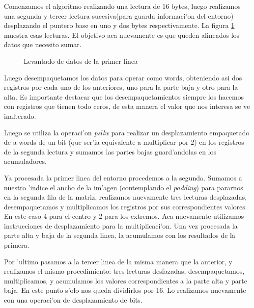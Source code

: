 Comenzamos el algoritmo realizando una lectura de 16 bytes, luego realizamos una segunda y tercer lectura sucesiva(para guarda informaci'on del entorno)
desplazando el puntero base en uno y dos bytes respectivamente. La figura \ref{est:s-dos} muestra esas lecturas. El objetivo aca nuevamente es que queden alineados los datos que necesito sumar.


\begin{figure}[h!]
\caption{Levantado de datos de la primer linea}
\label{est:s-dos}
\end{figure}

Luego desempaquetamos los datos para operar como words, obteniendo asi dos registros por cada uno de los anteriores, uno para la parte baja y otro para la alta. Es importante destacar que los desempaquetamientos siempre los hacemos con registros que tienen todo ceros, de esta manera el valor que nos interesa se ve inalterado. 

Luego se utiliza la operaci'on \textit{psllw} para realizar un desplazamiento empaquetado de a words de un bit (que ser'ia equivalente a multiplicar por 2) en los registros de la segunda lectura y sumamos las partes bajas guard'andolas en los acumuladores.

Ya procesada la primer linea del entorno procedemos a la segunda. Sumamos a nuestro 'indice el ancho de la 
im'agen (contemplando el \textit{padding}) para pararnos en la segunda fila de la matriz, realizamos nuevamente tres lecturas desplazadas, desempaquetamos y multiplicamos los registros por sus correspondientes valores. En este caso 4 para el centro y 2 para los extremos. Aca nuevamente utilizamos instrucciones de desplazamiento para la multiplicaci'on. Una vez procesada la parte alta y baja de la segunda linea, la acumulamos con los resultados de la primera.

Por 'ultimo pasamos a la tercer linea de la misma manera que la anterior, y realizamos el mismo procedimiento: tres lecturas desfazadas, desempaquetamos,  multiplicamos, y acumulamos los valores correspondientes a la parte alta y parte baja. En este punto s'olo nos queda dividirlos por 16. Lo realizamos nuevamente con una operaci'on de desplazamiento de bits. 

